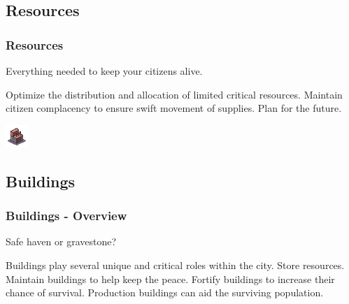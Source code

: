\documentclass[aspectratio=169]{beamer}
\begin{document}

\subsection{Resources}


\begin{frame}

  \frametitle{Resources}

  \begin{center}
    {\large Everything needed to keep your citizens alive.}
  \end{center}

  \begin{outline}
    \1 Optimize the distribution and allocation of limited critical resources.
    \1 Maintain citizen complacency to ensure swift movement of supplies.  
    \1 Plan for the future.
  \end{outline}

  \begin{center}
    \includegraphics[scale=3.0]{../Images/factory.png}
  \end{center}

\end{frame}


\subsection{Buildings}


\begin{frame}

  \frametitle{Buildings - Overview}

  \begin{center}
    {\large Safe haven or gravestone?}
  \end{center}


  \begin{outline}
    \1 Buildings play several unique and critical roles within the city.
    \1 Store resources.
    \1 Maintain buildings to help keep the peace.
    \1 Fortify buildings to increase their chance of survival.
    \1 Production buildings can aid the surviving population.
  \end{outline}




\end{frame}
\end{document}
